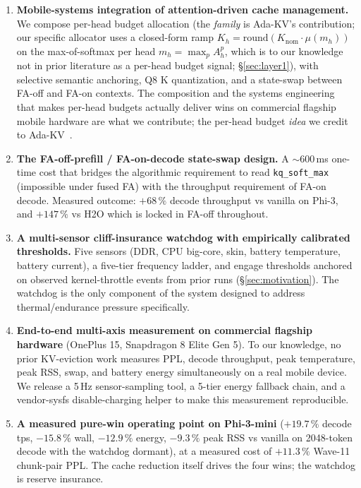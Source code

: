 \documentclass[sigconf, anonymous=false, screen=true]{acmart}
\begin{document}
\begin{enumerate}
\item \textbf{Mobile-systems integration of attention-driven cache management.} We compose per-head budget allocation (the \emph{family} is Ada-KV's contribution; our specific allocator uses a closed-form ramp $K_h = \mathrm{round}(K_{\text{nom}} \cdot \mu(m_h))$ on the max-of-softmax per head $m_h = \max_p A_h^p$, which is to our knowledge not in prior literature as a per-head budget signal; \S\ref{sec:layer1}), with selective semantic anchoring, Q8 K quantization, and a state-swap between FA-off and FA-on contexts. The composition and the systems engineering that makes per-head budgets actually deliver wins on commercial flagship mobile hardware are what we contribute; the per-head budget \emph{idea} we credit to Ada-KV~\cite{feng2025adakv}.
\item \textbf{The FA-off-prefill / FA-on-decode state-swap design.} A $\sim$600\,ms one-time cost that bridges the algorithmic requirement to read \texttt{kq\_soft\_max} (impossible under fused FA) with the throughput requirement of FA-on decode. Measured outcome: $+68\,\%$ decode throughput vs vanilla on Phi-3, and $+147\,\%$ vs H2O which is locked in FA-off throughout.
\item \textbf{A multi-sensor cliff-insurance watchdog with empirically calibrated thresholds.} Five sensors (DDR, CPU big-core, skin, battery temperature, battery current), a five-tier frequency ladder, and engage thresholds anchored on observed kernel-throttle events from prior runs (\S\ref{sec:motivation}). The watchdog is the only component of the system designed to address thermal/endurance pressure specifically.
\item \textbf{End-to-end multi-axis measurement on commercial flagship hardware} (OnePlus 15, Snapdragon 8 Elite Gen 5). To our knowledge, no prior KV-eviction work measures PPL, decode throughput, peak temperature, peak RSS, swap, and battery energy simultaneously on a real mobile device. We release a 5\,Hz sensor-sampling tool, a 5-tier energy fallback chain, and a vendor-sysfs disable-charging helper to make this measurement reproducible.
\item \textbf{A measured pure-win operating point on Phi-3-mini} ($+19.7\,\%$ decode tps, $-15.8\,\%$ wall, $-12.9\,\%$ energy, $-9.3\,\%$ peak RSS vs vanilla on 2048-token decode with the watchdog dormant), at a measured cost of $+11.3\,\%$ Wave-11 chunk-pair PPL. The cache reduction itself drives the four wins; the watchdog is reserve insurance.

\end{enumerate}
\end{document}
